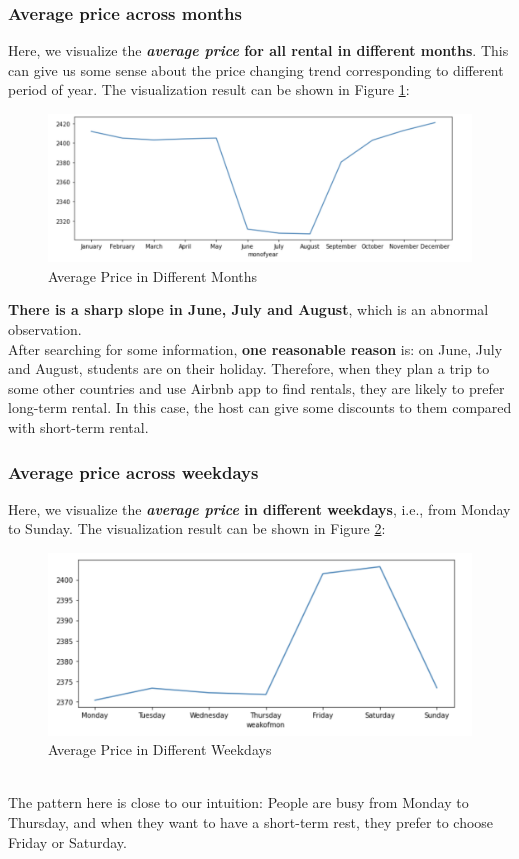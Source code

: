 \documentclass{article}
\begin{document}
	\subsubsection{Average price across months}
	Here, we visualize the \textbf{\textit{average price} for all rental in different months}. This can give us some sense about the price changing trend corresponding to different period of year. The visualization result can be shown in Figure \ref{fig:001}:
	\newpage
	\begin{figure}[h]
		\centering
		\includegraphics[width=.52\textheight]{avg_price_month.png}
		\caption{Average Price in Different Months}
		\label{fig:001}
	\end{figure}
	\noindent
	\textbf{There is a sharp slope in June, July and August}, which is an abnormal observation. 
	\vspace{3pt}
	\\
	After searching for some information, \textbf{one reasonable reason} is: on June, July and August, students are on their holiday. Therefore, when they plan a trip to some other countries and use Airbnb app to find rentals, they are likely to prefer long-term rental. In this case, the host can give some discounts to them compared with short-term rental.
	\subsubsection{Average price across weekdays}
	Here, we visualize the\textbf{ \textit{average price} in different weekdays}, i.e., from Monday to Sunday. The visualization result can be shown in Figure \ref{fig:002}:
	\begin{figure}[h]
		\centering
		\includegraphics[width=.43\textheight]{avg_price_weekday.png}
		\caption{Average Price in Different Weekdays}
		\label{fig:002}
	\end{figure}
	\\
	The pattern here is close to our intuition: People are busy from Monday to Thursday, and when they want to have a short-term rest, they prefer to choose Friday or Saturday.
\end{document}
